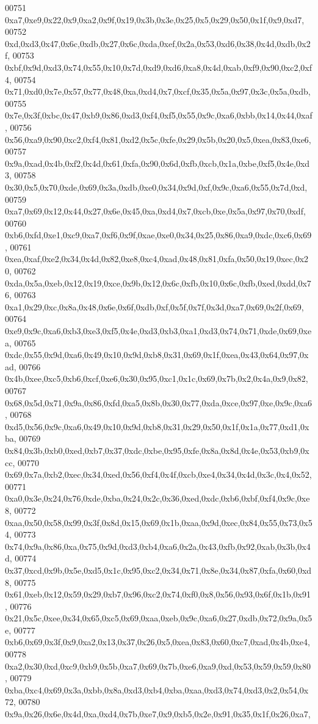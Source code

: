 \begin{DoxyCode}
00751   0xa7,0xe9,0x22,0x9,0xa2,0x9f,0x19,0x3b,0x3e,0x25,0x5,0x29,0x50,0x1f,0x9,0xd7,
00752   0xd,0xd3,0x47,0x6c,0xdb,0x27,0x6c,0xda,0xef,0x2a,0x53,0xd6,0x38,0x4d,0xdb,0x2f,
00753   0xbf,0x9d,0xd3,0x74,0x55,0x10,0x7d,0xd9,0xd6,0xa8,0x4d,0xab,0xf9,0x90,0xc2,0xf4,
00754   0x71,0xd0,0x7e,0x57,0x77,0x48,0xa,0xd4,0x7,0xcf,0x35,0x5a,0x97,0x3c,0x5a,0xdb,
00755   0x7e,0x3f,0xbc,0x47,0xb9,0x86,0xd3,0xf4,0xf5,0x55,0x9c,0xa6,0xbb,0x14,0x44,0xaf,
00756   0x56,0xa9,0x90,0xc2,0xf4,0x81,0xd2,0x5c,0xfe,0x29,0x5b,0x20,0x5,0xea,0x83,0xe6,
00757   0x9a,0xad,0x4b,0xf2,0x4d,0x61,0xfa,0x90,0x6d,0xfb,0xcb,0x1a,0xbe,0xf5,0x4e,0xd3,
00758   0x30,0x5,0x70,0xde,0x69,0x3a,0xdb,0xe0,0x34,0x9d,0xf,0x9c,0xa6,0x55,0x7d,0xd,
00759   0xa7,0x69,0x12,0x44,0x27,0x6e,0x45,0xa,0xd4,0x7,0xcb,0xe,0x5a,0x97,0x70,0xdf,
00760   0xb6,0xfd,0xe1,0xc9,0xa7,0xf6,0x9f,0xae,0xe0,0x34,0x25,0x86,0xa9,0xdc,0xc6,0x69,
00761   0xea,0xaf,0xe2,0x34,0x4d,0x82,0xe8,0xc4,0xad,0x48,0x81,0xfa,0x50,0x19,0xec,0x20,
00762   0xda,0x5a,0xeb,0x12,0x19,0xce,0x9b,0x12,0x6c,0xfb,0x10,0x6c,0xfb,0xed,0xdd,0x76,
00763   0xa1,0x29,0xc,0x8a,0x48,0x6e,0x6f,0xdb,0xf,0x5f,0x7f,0x3d,0xa7,0x69,0x2f,0x69,
00764   0xe9,0x9c,0xa6,0xb3,0xe3,0xf5,0x4e,0xd3,0xb3,0xa1,0xd3,0x74,0x71,0xde,0x69,0xea,
00765   0xdc,0x55,0x9d,0xa6,0x49,0x10,0x9d,0xb8,0x31,0x69,0x1f,0xea,0x43,0x64,0x97,0xad,
00766   0x4b,0xee,0xc5,0xb6,0xcf,0xe6,0x30,0x95,0xc1,0x1c,0x69,0x7b,0x2,0x4a,0x9,0x82,
00767   0x68,0x5d,0x71,0x9a,0x86,0xfd,0xa5,0x8b,0x30,0x77,0xda,0xce,0x97,0xe,0x9c,0xa6,
00768   0xd5,0x56,0x9c,0xa6,0x49,0x10,0x9d,0xb8,0x31,0x29,0x50,0x1f,0x1a,0x77,0xd1,0xba,
00769   0x84,0x3b,0xb0,0xed,0xb7,0x37,0xdc,0xbe,0x95,0xfe,0x8a,0x8d,0x4e,0x53,0xb9,0xcc,
00770   0x69,0x7a,0xb2,0xec,0x34,0xed,0x56,0xf4,0x4f,0xcb,0xe4,0x34,0x4d,0x3c,0x4,0x52,
00771   0xa0,0x3e,0x24,0x76,0xde,0xba,0x24,0x2c,0x36,0xed,0xdc,0xb6,0xbf,0xf4,0x9c,0xe8,
00772   0xaa,0x50,0x58,0x99,0x3f,0x8d,0x15,0x69,0x1b,0xaa,0x9d,0xec,0x84,0x55,0x73,0x54,
00773   0x74,0x9a,0x86,0xa,0x75,0x9d,0xd3,0xb4,0xa6,0x2a,0x43,0xfb,0x92,0xab,0x3b,0x4d,
00774   0x37,0xcd,0x9b,0x5e,0xd5,0x1c,0x95,0xc2,0x34,0x71,0x8e,0x34,0x87,0xfa,0x60,0xd8,
00775   0x61,0xeb,0x12,0x59,0x29,0xb7,0x96,0xc2,0x74,0xf0,0x8,0x56,0x93,0x6f,0x1b,0x91,
00776   0x21,0x5c,0xee,0x34,0x65,0xc5,0x69,0xaa,0xeb,0x9c,0xa6,0x27,0xdb,0x72,0x9a,0x5e,
00777   0xb6,0x69,0x3f,0x9,0xa2,0x13,0x37,0x26,0x5,0xea,0x83,0x60,0xc7,0xad,0x4b,0xe4,
00778   0xa2,0x30,0xd,0xc9,0xb9,0x5b,0xa7,0x69,0x7b,0xe6,0xa9,0xd,0x53,0x59,0x59,0x80,
00779   0xba,0xc4,0x69,0x3a,0xbb,0x8a,0xd3,0xb4,0xba,0xaa,0xd3,0x74,0xd3,0x2,0x54,0x72,
00780   0x9a,0x26,0x6e,0x4d,0xa,0xd4,0x7b,0xe7,0x9,0xb5,0x2e,0x91,0x35,0x1f,0x26,0xa7,

\end{DoxyCode}
